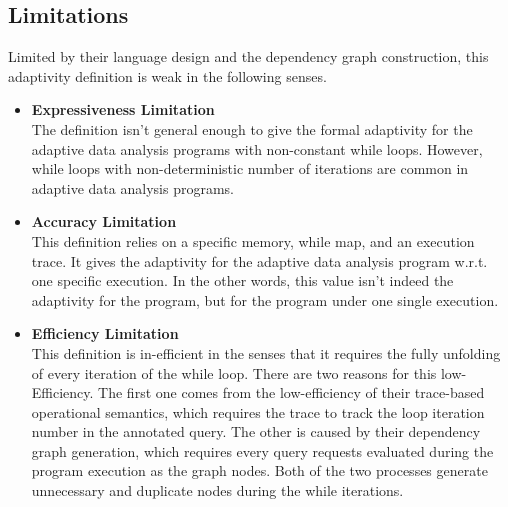 \subsection*{Limitations}
Limited by their language design and the dependency graph construction,
this adaptivity definition is weak in the following senses.
\begin{itemize}
    \item \textbf{Expressiveness Limitation}
    \\
    The definition isn't general enough to give the formal adaptivity for the adaptive data analysis programs with non-constant
    while loops. However, while loops with non-deterministic number of iterations are common in adaptive data analysis programs.
    \item \textbf{Accuracy Limitation}
    \\
    This definition relies on a specific memory, while map, and an execution trace.
    It gives the adaptivity for the adaptive data analysis program w.r.t. one specific
    execution. In the other words, this value isn't indeed the adaptivity for the program, but for the program under one single execution.
    \item \textbf{Efficiency Limitation}
    \\
    This definition is in-efficient in the senses that it requires the fully unfolding of every iteration of the while loop.
    There are two reasons for this low-Efficiency.
    The first one comes from the low-efficiency of their trace-based operational semantics,
    which requires the trace to track the loop iteration number in the annotated query.
    The other is caused by their dependency graph generation, which requires every query requests evaluated during the program execution
    as the graph nodes.
    Both of the two processes generate unnecessary and duplicate nodes during the while iterations.
\end{itemize}